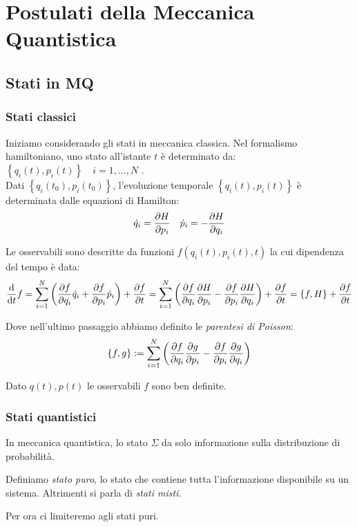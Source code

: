 

\chapter{Postulati della Meccanica Quantistica}


\section{Stati in MQ}

\subsection{Stati classici}
Iniziamo considerando gli stati in meccanica classica.
Nel formalismo hamiltoniano, uno stato all'istante \(t\) 
è determinato da: \(\left\{ q_i(t), p_i(t) \right\}\quad i = 1,\dots, N\) .\\
Dati \(\left\{ q_i(t_0),p_i(t_0) \right\}\), l'evoluzione temporale \(\left\{ q_i(t), p_i(t)\right\}\) è determinata dalle equazioni di Hamilton:
\begin{equation}
    \dot{q}_i= \pdv{H}{p_i } \quad \dot{p}_i = -\pdv{H}{q_i }
\end{equation}

Le osservabili sono descritte da funzioni \(f(q_i(t),p_i(t),t)\) la cui dipendenza del tempo è data:
\[
\dv{t} f = \sum_{i=1}^{N} \left( \pdv{f}{q_i}\dot{q}_i+ \pdv{f}{p_i}\dot{p}_i  \right)  +\pdv{f}{t}
= \sum_{i=1}^{N} \left( \pdv{f}{q_i}\pdv{H}{p_i}-\pdv{f}{p_i}\pdv{H}{q_i} \right)+\pdv{f}{t}
= \left\{ f, H \right\} +\pdv{f}{t}
\]

Dove nell'ultimo passaggio abbiamo definito le \textit{parentesi di Poisson}:
\begin{equation}
    \left\{ f,g \right\}:= \sum_{i=1}^{N}\left( \pdv{f}{q_i}\pdv{g}{p_i}-\pdv{f}{p_i}\pdv{g}{q_i} \right)    
\end{equation}

\begin{remark}
    Dato \(q(t), p(t)\) le osservabili $f$ sono ben definite.
\end{remark}


\subsection{Stati quantistici}
In meccanica quantistica, lo stato \(\Sigma\) da solo informazione sulla distribuzione di probabilità.

\begin{definition}
    Definiamo \textit{stato puro}, lo stato che contiene tutta l'informazione disponibile su un sistema.
    Altrimenti si parla di \textit{stati misti}.
\end{definition}
Per ora ci limiteremo agli stati puri.

